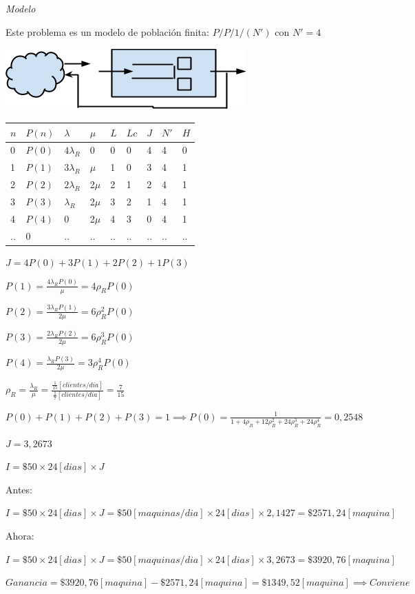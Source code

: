 \documentclass[a4paper,11pt]{article}
\begin{document}
\begin{enumerate}[a)]
    \vspace{21pt}
    \leftskip=0pt
    \parindent=0pt
    \textit{Modelo}

    Este problema es un modelo de población finita:  $P/P/1/(N')$ con $N'=4$

    \includegraphics[width=262pt, height=67pt, keepaspectratio=true]{TP1-Colas-fig004.png}

    \vspace{55pt}
    \begin{tabular}{|>{\raggedright}p{28pt}|>{\raggedright}p{26pt}|>{\raggedright}p{26pt}|>{\raggedright}p{26pt}|>{\raggedright}p{26pt}|>{\raggedright}p{26pt}|>{\raggedright}p{26pt}|>{\raggedright}p{26pt}|>{\raggedright}p{26pt}|}
    \hline
    $n$ & $P(n)$ & $\lambda$ & $\mu$ & $L$ & $Lc$ & $J$ & $N'$ & $H$\tabularnewline
    \hline
    0 & $P(0)$ & $4\lambda_R$ & 0 & 0 & 0 & 4 & 4 & 0\tabularnewline
    \hline
    1 & $P(1)$ & $3\lambda_R$ & $\mu$ & 1 & 0 & 3 & 4 & 1\tabularnewline
    \hline
    2 & $P(2)$ & $2\lambda_R$ & 2$\mu$ & 2 & 1 & 2 & 4 & 1\tabularnewline
    \hline
    3 & $P(3)$ & $\lambda_R$ & 2$\mu$ & 3 & 2 & 1 & 4 & 1\tabularnewline
    \hline
    4 & $P(4)$ & 0 & 2$\mu$ & 4 & 3 & 0 & 4 & 1\tabularnewline
    \hline
    .. & 0 & .. & .. & .. & .. & .. & .. & ..\tabularnewline
    \hline
    \end{tabular}

    \vspace{13pt}
    $J = 4P(0) + 3P(1) + 2P(2) + 1P(3)$

    $P(1) = \frac{4\lambda_R P(0)}{\mu} = 4\rho_R P(0)$

    $P(2) = \frac{3\lambda_R P(1)}{2\mu} = 6\rho_R^2 P(0)$

    $P(3) = \frac{2\lambda_R P(2)}{2\mu} = 6\rho_R^3 P(0)$

    $P(4) = \frac{\lambda_R P(3)}{2\mu} = 3\rho_R^4 P(0)$

    $\rho_R = \frac{\lambda_R}{\mu} = \frac{\frac{1}{15}[clientes/dia]}{\frac{1}{7}[clientes/dia]} = \frac{7}{15}$

    $P(0) + P(1) + P(2) +P(3) = 1 \implies P(0) =
    \frac{1}{1+4\rho_R+12\rho_R^2+24\rho_R^3+24\rho_R^4} = 0,2548$

    $J = 3,2673$

    $I = \$50 \times 24[dias] \times J$

    Antes:

    $I = \$50 \times 24[dias] \times J = \$50[maquinas/dia] \times 24[dias] \times 2,1427 = \$2571,24[maquina]$

    Ahora:

    $I = \$50 \times 24[dias] \times J = \$50[maquinas/dia] \times 24[dias] \times 3,2673 = \$3920,76[maquina]$

    $Ganancia = \$3920,76[maquina] - \$2571,24[maquina] = \$1349,52[maquina] \implies Conviene $
\end{enumerate}
\end{document}
